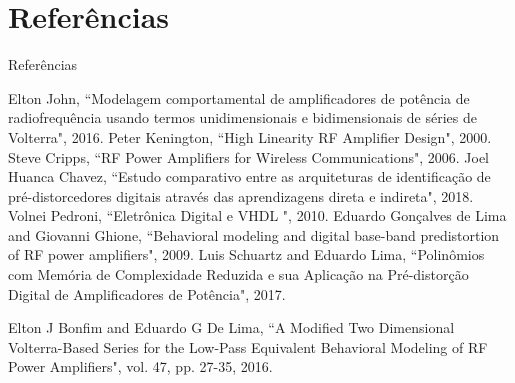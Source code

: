 \documentclass{if-beamer}
\begin{document}
\section*{Referências}
\begin{frame}{Referências}
	
		\begin{thebibliography}{}
		 Elton John, ``Modelagem comportamental de amplificadores de potência de radiofrequência usando termos unidimensionais e bidimensionais de séries de Volterra", 2016.
		 Peter Kenington, ``High Linearity RF Amplifier Design", 2000.
		 Steve Cripps, ``RF Power Amplifiers for Wireless Communications", 2006.
		 Joel Huanca Chavez, ``Estudo comparativo entre as arquiteturas de identificação de pré-distorcedores digitais através das aprendizagens direta e indireta", 2018.
		 Volnei Pedroni, ``Eletrônica Digital e VHDL ", 2010.
		 Eduardo Gonçalves de Lima and Giovanni Ghione, ``Behavioral modeling and digital base-band predistortion of RF power amplifiers", 2009.
		 Luis Schuartz and Eduardo Lima, ``Polinômios com Memória de Complexidade Reduzida e sua Aplicação na Pré-distorção Digital de Amplificadores de Potência", 2017.
		
		 Elton J Bonfim and Eduardo G De Lima, ``A Modified Two Dimensional Volterra-Based Series for the Low-Pass Equivalent Behavioral Modeling of RF Power Amplifiers", vol. 47, pp. 27-35, 2016.
		
		
	\end{thebibliography}

\end{frame}


\end{document}
